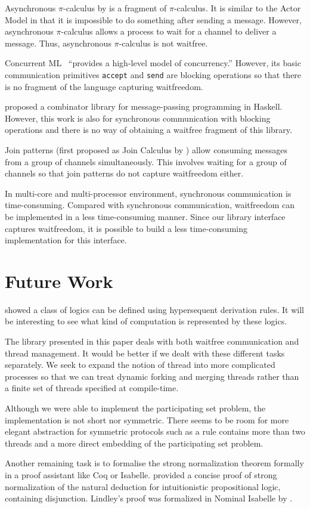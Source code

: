 Asynchronous $\pi$-calculus by \citet{api} is a fragment of
$\pi$-calculus.  It is
similar to the Actor Model in that it is impossible to do something
after sending a message.  However, asynchronous $\pi$-calculus
allows a process to wait for a channel to deliver a message.  Thus,
asynchronous $\pi$-calculus is not waitfree.

Concurrent ML~\citep{concurrentML} ``provides a high-level model of
concurrency.''  However, its basic communication primitives
\texttt{accept} and \texttt{send} are blocking operations so that there
is no fragment of the language capturing waitfreedom.

\citet{Brown} proposed a combinator library for message-passing
programming in Haskell.  However, this work is also for synchronous
communication with blocking operations and there is no way of
obtaining a waitfree
fragment of this library.

Join patterns (first proposed as Join Calculus by \citet{join}) allow
consuming messages from a group of
channels simultaneously.  This involves waiting for a group of channels
so that join patterns do not capture waitfreedom either.

In multi-core and multi-processor environment, synchronous communication
is time-consuming.  Compared with
synchronous communication, waitfreedom can be implemented in a less
time-consuming manner.  Since our library
interface captures waitfreedom, it is possible to build a less
time-consuming implementation for this interface.

\section{Future Work}

\citet*{agt08} showed a class of logics can be defined using
hypersequent derivation rules.  It will be interesting to see what kind
of computation is represented by these logics.

The library presented in this paper deals with both waitfree
communication and thread management.  It would be better if we dealt with
these different tasks separately.
 We seek to expand the notion of thread into more complicated
 processes so that we can treat dynamic
 forking and merging threads rather
 than a finite set of threads specified at compile-time.

Although we were able to implement the participating set problem,
the implementation is not short nor symmetric.
There seems to be room for more elegant abstraction for symmetric
protocols such as
a rule contains more than two threads and a more direct embedding of the
participating set problem.

Another remaining task is to formalise the strong normalization theorem
formally in a proof assistant like Coq or Isabelle.
\citet{ttlifting} provided a concise proof of strong normalization of
the natural deduction for
intuitionistic propositional logic, containing disjunction.
Lindley's proof was formalized in Nominal Isabelle by
\citet{Doczkal2009}.
